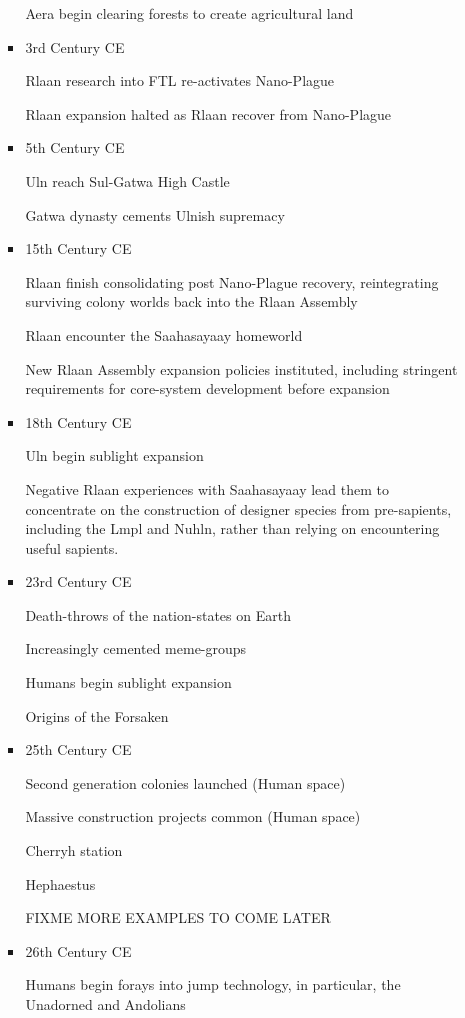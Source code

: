 \begin{itemize}
\begin{itemize}
\begin{itemize}
Aera begin clearing forests to create agricultural land 
\item	3rd Century CE 

Rlaan research into FTL re-activates Nano-Plague 

Rlaan expansion halted as Rlaan recover from Nano-Plague 

\item	5th Century CE 

Uln reach Sul-Gatwa High Castle 

Gatwa dynasty cements Ulnish supremacy 

\item	15th Century CE 

Rlaan finish consolidating post Nano-Plague recovery, reintegrating
surviving colony worlds back into the Rlaan Assembly

Rlaan encounter the Saahasayaay homeworld 

New Rlaan Assembly expansion policies instituted, including stringent requirements for core-system development before expansion 

\item	18th Century CE 

Uln begin sublight expansion 

Negative Rlaan experiences with Saahasayaay lead them to concentrate
on the construction of designer species from pre-sapients, including
the Lmpl and Nuhln, rather than relying on encountering useful
sapients.

\item	23rd Century CE 

Death-throws of the nation-states on Earth 

Increasingly cemented meme-groups 

Humans begin sublight expansion 

Origins of the Forsaken 

\item	25th Century CE 

Second generation colonies launched (Human space) 

Massive construction projects common (Human space) 

Cherryh station 

Hephaestus 

FIXME MORE EXAMPLES TO COME LATER 
\item	26th Century CE 

Humans begin forays into jump technology, in particular, the Unadorned
and Andolians


\end{itemize}
\end{itemize}
\end{itemize}
